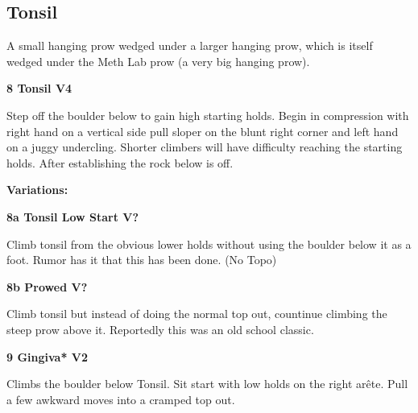 \begin{multicols}{2}
\needspace{1.5cm}
\subsection*{Tonsil}\label{bf:Tonsil}
A small hanging prow wedged under a larger hanging prow, which is itself wedged under the Meth Lab prow (a very big hanging prow).\\
	


\needspace{1.5cm}
\label{rt:Tonsil}
\colorbox{RoyalBlue!20}{
\parbox{0.95\linewidth}{
\textbf{
8 Tonsil V4  
}}}

\begin{adjustwidth}{0.5cm}{}			
Step off the boulder below to gain high starting holds. Begin in compression with right hand on a vertical side pull sloper on the blunt right corner and left hand on a juggy undercling.  Shorter climbers will have difficulty reaching the starting holds. After establishing the rock below is off.
\end{adjustwidth}

\begin{adjustwidth}{0.5cm}{}				
\needspace{3cm}
\textbf{Variations:} \newline

\needspace{1.5cm}
\label{vr:Tonsil Low Start}
\colorbox{black!20}{
\parbox{0.95\linewidth}{
\textbf{
8a Tonsil Low Start V?  
}}}

\begin{adjustwidth}{0.5cm}{}			
Climb tonsil from the obvious lower holds without using the boulder below it as a foot. Rumor has it that this has been done. (No Topo)
\end{adjustwidth}



\needspace{1.5cm}
\label{vr:Prowed}
\colorbox{black!20}{
\parbox{0.95\linewidth}{
\textbf{
8b Prowed V?  \warn\warn
}}}

\begin{adjustwidth}{0.5cm}{}			
Climb tonsil but instead of doing the normal top out, countinue climbing the steep prow above it. Reportedly this was an old school classic.
\end{adjustwidth}


\end{adjustwidth}


\needspace{1.5cm}
\label{rt:Gingiva}
\colorbox{green!20}{
\parbox{0.95\linewidth}{
\textbf{
9 Gingiva* V2  
}}}

\begin{adjustwidth}{0.5cm}{}			
Climbs the boulder below Tonsil. Sit start with low holds on the right arête. Pull a few awkward moves into a cramped top out.
\end{adjustwidth}





\end{multicols}

